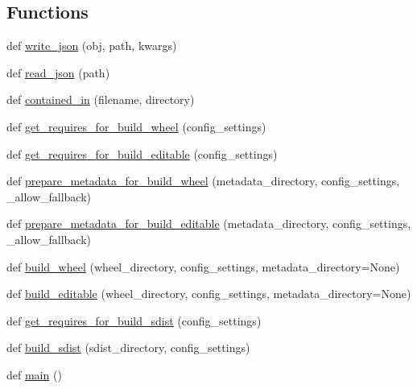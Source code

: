 \subsection*{Functions}
\begin{DoxyCompactItemize}
\item 
def \hyperlink{namespacepip_1_1__vendor_1_1pep517_1_1in__process_1_1__in__process_ab48bc6fc9bd1a59f29eae2d24db65c1f}{write\+\_\+json} (obj, path, kwargs)
\item 
def \hyperlink{namespacepip_1_1__vendor_1_1pep517_1_1in__process_1_1__in__process_a64c825d95f3bcb1577abb669630bc601}{read\+\_\+json} (path)
\item 
def \hyperlink{namespacepip_1_1__vendor_1_1pep517_1_1in__process_1_1__in__process_adf716c4edf860d489a33484c51c8af7c}{contained\+\_\+in} (filename, directory)
\item 
def \hyperlink{namespacepip_1_1__vendor_1_1pep517_1_1in__process_1_1__in__process_ac8a3be31af83d2760f667b7262bb6e87}{get\+\_\+requires\+\_\+for\+\_\+build\+\_\+wheel} (config\+\_\+settings)
\item 
def \hyperlink{namespacepip_1_1__vendor_1_1pep517_1_1in__process_1_1__in__process_a2e52ab5df66ab1385120dcc3c759c2b7}{get\+\_\+requires\+\_\+for\+\_\+build\+\_\+editable} (config\+\_\+settings)
\item 
def \hyperlink{namespacepip_1_1__vendor_1_1pep517_1_1in__process_1_1__in__process_aa97e573cd2afd965748be379151244a9}{prepare\+\_\+metadata\+\_\+for\+\_\+build\+\_\+wheel} (metadata\+\_\+directory, config\+\_\+settings, \+\_\+allow\+\_\+fallback)
\item 
def \hyperlink{namespacepip_1_1__vendor_1_1pep517_1_1in__process_1_1__in__process_ad000b0abe88f62609918a280904bfb9f}{prepare\+\_\+metadata\+\_\+for\+\_\+build\+\_\+editable} (metadata\+\_\+directory, config\+\_\+settings, \+\_\+allow\+\_\+fallback)
\item 
def \hyperlink{namespacepip_1_1__vendor_1_1pep517_1_1in__process_1_1__in__process_ac813d26be56d2b42a422a70cff999e8b}{build\+\_\+wheel} (wheel\+\_\+directory, config\+\_\+settings, metadata\+\_\+directory=None)
\item 
def \hyperlink{namespacepip_1_1__vendor_1_1pep517_1_1in__process_1_1__in__process_a1f230783addb0a5913e9b10082c99eae}{build\+\_\+editable} (wheel\+\_\+directory, config\+\_\+settings, metadata\+\_\+directory=None)
\item 
def \hyperlink{namespacepip_1_1__vendor_1_1pep517_1_1in__process_1_1__in__process_aad68dab66e561097182866e545c605ff}{get\+\_\+requires\+\_\+for\+\_\+build\+\_\+sdist} (config\+\_\+settings)
\item 
def \hyperlink{namespacepip_1_1__vendor_1_1pep517_1_1in__process_1_1__in__process_a722b4aae02171a873cbd83f4a5fcd5bf}{build\+\_\+sdist} (sdist\+\_\+directory, config\+\_\+settings)
\item 
def \hyperlink{namespacepip_1_1__vendor_1_1pep517_1_1in__process_1_1__in__process_ae97daa93f2d9720c34f1a7153e69281c}{main} ()
\end{DoxyCompactItemize}
